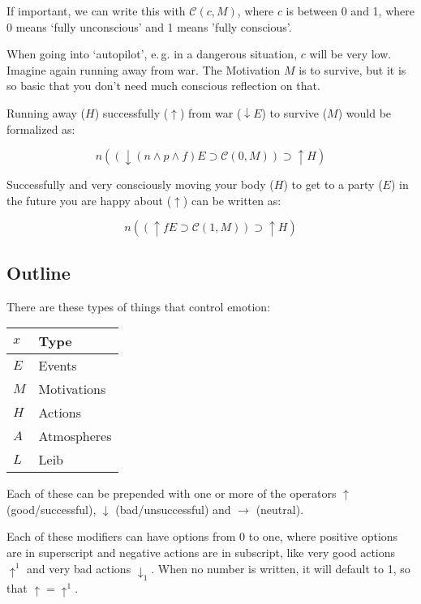 \documentclass{scrartcl}
\begin{document}
If important, we can write this with $\mathcal{C}(c, M)$, where $c$ is between 0 and 1, where
0 means `fully unconscious' and 1 means 'fully conscious'.

When going into `autopilot', e.\,g. in a dangerous situation, $c$ will be very low. Imagine again running
away from war. The Motivation $M$ is to survive, but it is so basic that you don't need much conscious reflection
on that.

Running away ($H$) successfully ($\uparrow$) from war ($\downarrow E$) to survive ($M$) would be formalized as:

\begin{equation} n 
	\left(
		\left(
			\downarrow \left(n\wedge p\wedge f\right)E \supset \mathcal{C}(0, M)
		\right)
		\supset \uparrow H 
	\right)
\end{equation}

Successfully and very consciously moving your body ($H$) to get to a party ($E$) in the future you are happy about ($\uparrow$) can be written as:

\begin{equation} n 
	\left(
		\left(
			\uparrow f E \supset \mathcal{C}(1, M)
		\right)
		\supset \uparrow H 
	\right)
\end{equation}

\subsection{Outline}

There are these types of things that control emotion:

\begin{tabular}{l|l}
	$x$ & Type \\ \hline
	$E$ & Events \\
	$M$ & Motivations \\
	$H$ & Actions \\
	$A$ & Atmospheres \\
	$L$ & Leib
\end{tabular}

Each of these can be prepended with one or more of the operators $\uparrow$ (good/successful), $\downarrow$ (bad/unsuccessful) and $\rightarrow$ (neutral).

Each of these modifiers can have options from 0 to one, where positive options are in superscript and negative actions are in subscript, like
very good actions $\uparrow^1$ and very bad actions $\downarrow_1$. When no number is written, it will default to 1, so that $\uparrow = \uparrow^1$.
\end{document}
